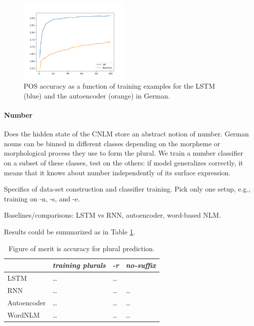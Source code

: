\begin{figure}
\includegraphics[width=0.48\textwidth]{figures/german_pos_nouns_verbs.png}
	\caption{POS accuracy as a function of training examples for the LSTM (blue) and the autoencoder (orange) in German.}\label{fig:pos-induction}
\end{figure}





\paragraph{Number}

Does the hidden state of the CNLM store an abstract notion of
number. German nouns can be binned in different classes depending on
the morpheme or morphological process they use to form the plural. We
train a number classifier on a subset of these classes, test on the
others: if model generalizes correctly, it means that it knows about
number independently of its surface expression.

Specifics of data-set construction and classifier training. Pick only one setup, e.g., training on -n, -s, and -e.

Baselines/comparisons: LSTM vs RNN, autoencoder, word-based NLM.

Results could be summarized as in Table \ref{tab:number-results}.


\begin{table}[t]
  \begin{center}
    \begin{tabular}{l|l|l|l}
      \multicolumn{1}{c}{}&\emph{training plurals}&\emph{-r}&\emph{no-suffix}\\
      \hline
      LSTM&\ldots&\ldots\\
      RNN&\ldots&\ldots&\ldots\\
      Autoencoder&\ldots&\ldots&\ldots\\
      WordNLM&\ldots&\ldots&\ldots\\
    \end{tabular}
  \end{center}
  \caption{\label{tab:number-results} Figure of merit is accuracy for plural prediction.}
\end{table}


